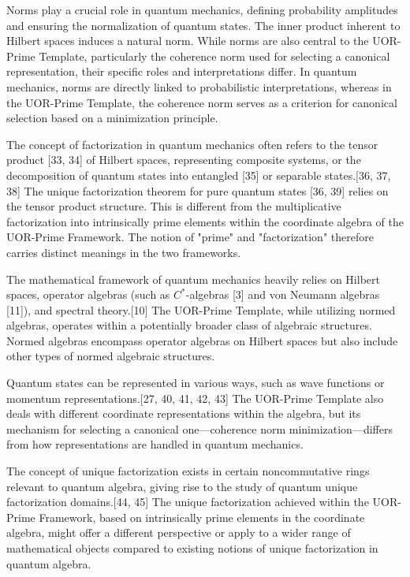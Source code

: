 \documentclass{article}
\begin{document}
Norms play a crucial role in quantum mechanics, defining probability amplitudes and ensuring the normalization of quantum states. The inner product inherent to Hilbert spaces induces a natural norm. While norms are also central to the UOR-Prime Template, particularly the coherence norm used for selecting a canonical representation, their specific roles and interpretations differ. In quantum mechanics, norms are directly linked to probabilistic interpretations, whereas in the UOR-Prime Template, the coherence norm serves as a criterion for canonical selection based on a minimization principle.

The concept of factorization in quantum mechanics often refers to the tensor product [33, 34] of Hilbert spaces, representing composite systems, or the decomposition of quantum states into entangled [35] or separable states.[36, 37, 38] The unique factorization theorem for pure quantum states [36, 39] relies on the tensor product structure. This is different from the multiplicative factorization into intrinsically prime elements within the coordinate algebra of the UOR-Prime Framework. The notion of "prime" and "factorization" therefore carries distinct meanings in the two frameworks.

The mathematical framework of quantum mechanics heavily relies on Hilbert spaces, operator algebras (such as $C^*$-algebras [3] and von Neumann algebras [11]), and spectral theory.[10] The UOR-Prime Template, while utilizing normed algebras, operates within a potentially broader class of algebraic structures. Normed algebras encompass operator algebras on Hilbert spaces but also include other types of normed algebraic structures.

Quantum states can be represented in various ways, such as wave functions or momentum representations.[27, 40, 41, 42, 43] The UOR-Prime Template also deals with different coordinate representations within the algebra, but its mechanism for selecting a canonical one—coherence norm minimization—differs from how representations are handled in quantum mechanics.

The concept of unique factorization exists in certain noncommutative rings relevant to quantum algebra, giving rise to the study of quantum unique factorization domains.[44, 45] The unique factorization achieved within the UOR-Prime Framework, based on intrinsically prime elements in the coordinate algebra, might offer a different perspective or apply to a wider range of mathematical objects compared to existing notions of unique factorization in quantum algebra.
\end{document}
